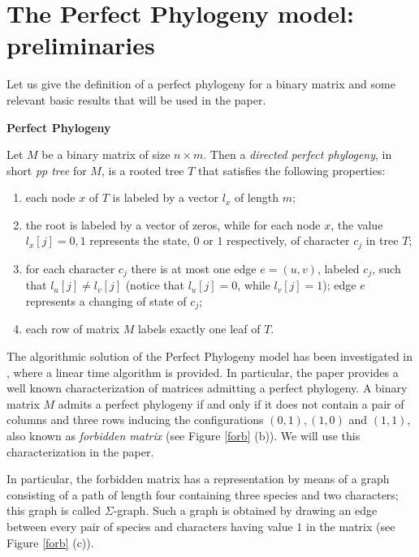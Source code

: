 \documentclass{llncs}
\begin{document}
 
 \section{The Perfect Phylogeny model: preliminaries}
 
 \label{pre1}
 
  
Let us give the definition  of a perfect phylogeny for a binary matrix  and  some relevant basic results that will be used in the paper.
 
 
 \noindent
 {\bf Perfect Phylogeny}
 
 Let  $M$ be a binary matrix of size $n \times m$. Then a {\it directed
perfect phylogeny}, in short  {\em  pp tree} for $M$, is a rooted tree $T$
that satisfies the following properties:

\begin{enumerate}
 
 \item each node $x$ of $T$ is labeled by a vector $l_x$ of length $m$;
 
 \item  the root is labeled  by a vector of zeros, while for each  node $x$, the value 
 $l_x[j] = 0,1$ represents  the state,  $0$ or $1$ respectively, of character $c_j$ in tree $T$;

\item  for each character $c_j$ there is at most one edge $e=(u,v)$, labeled $c_j$, such that
$l_u[j] \neq l_v[j]$ (notice that $l_u[j]=0$, while $l_v[j]=1$);
edge $e$ represents a changing of state of $c_j$; 

\item each row of matrix $M$ labels exactly one leaf of $T$.

\end{enumerate}
 
The algorithmic solution of the Perfect Phylogeny model has been investigated in \cite{Gus91}, where a linear time algorithm is provided. 
In particular, the paper \cite{Gus91} provides a well known characterization of matrices admitting a perfect phylogeny.
A binary matrix $M$ admits a perfect phylogeny if and only if it does not contain a pair of columns and three rows inducing    the configurations $(0,1), (1,0)$ and $(1,1)$,  also known as   {\em forbidden matrix} (see Figure \ref{forb} (b)). We will use this  characterization  in the paper.

In particular, the forbidden matrix has a representation by means of a  graph consisting of a path of length four containing three species and two characters; this graph  is   called $\Sigma$-graph. Such a graph is obtained by drawing an edge between every pair of  species and  characters having value $1$ in the matrix (see Figure \ref{forb} (c)). 
\end{document}
